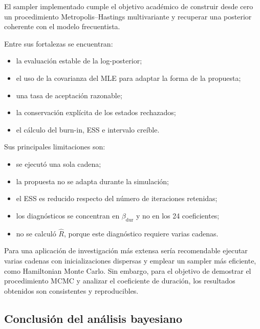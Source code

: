 El sampler implementado cumple el objetivo académico de construir desde
cero un procedimiento Metropolis--Hastings multivariante y recuperar una
posterior coherente con el modelo frecuentista.

Entre sus fortalezas se encuentran:

\begin{itemize}
    \item la evaluación estable de la log-posterior;

    \item el uso de la covarianza del MLE para adaptar la forma de la
    propuesta;

    \item una tasa de aceptación razonable;

    \item la conservación explícita de los estados rechazados;

    \item el cálculo del burn-in, ESS e intervalo creíble.
\end{itemize}

Sus principales limitaciones son:

\begin{itemize}
    \item se ejecutó una sola cadena;

    \item la propuesta no se adapta durante la simulación;

    \item el ESS es reducido respecto del número de iteraciones
    retenidas;

    \item los diagnósticos se concentran en
    \(\beta_{\mathrm{dur}}\) y no en los 24 coeficientes;

    \item no se calculó \(\widehat{R}\), porque este diagnóstico requiere
    varias cadenas.
\end{itemize}

Para una aplicación de investigación más extensa sería recomendable
ejecutar varias cadenas con inicializaciones dispersas y emplear un
sampler más eficiente, como Hamiltonian Monte Carlo. Sin embargo, para
el objetivo de demostrar el procedimiento MCMC y analizar el coeficiente
de duración, los resultados obtenidos son consistentes y reproducibles.

\subsection{Conclusión del análisis bayesiano}


